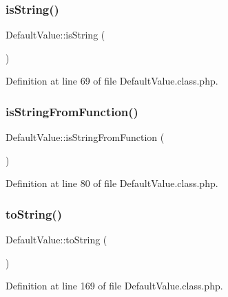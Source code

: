 \hypertarget{classDefaultValue_a2ff17e887cf955aea26fbb1b3e11f491}{}\label{classDefaultValue_a2ff17e887cf955aea26fbb1b3e11f491} 
\subsubsection{\texorpdfstring{is\+String()}{isString()}}
{\footnotesize\ttfamily Default\+Value\+::is\+String (\begin{DoxyParamCaption}{ }\end{DoxyParamCaption})}



Definition at line 69 of file Default\+Value.\+class.\+php.

\hypertarget{classDefaultValue_aeef8c65be1e3cfe7459916653d6d9181}{}\label{classDefaultValue_aeef8c65be1e3cfe7459916653d6d9181} 
\subsubsection{\texorpdfstring{is\+String\+From\+Function()}{isStringFromFunction()}}
{\footnotesize\ttfamily Default\+Value\+::is\+String\+From\+Function (\begin{DoxyParamCaption}{ }\end{DoxyParamCaption})}



Definition at line 80 of file Default\+Value.\+class.\+php.

\hypertarget{classDefaultValue_a0f0d4d1cc64b3bfb8d2acec2b113be4d}{}\label{classDefaultValue_a0f0d4d1cc64b3bfb8d2acec2b113be4d} 
\subsubsection{\texorpdfstring{to\+String()}{toString()}}
{\footnotesize\ttfamily Default\+Value\+::to\+String (\begin{DoxyParamCaption}{ }\end{DoxyParamCaption})}



Definition at line 169 of file Default\+Value.\+class.\+php.



